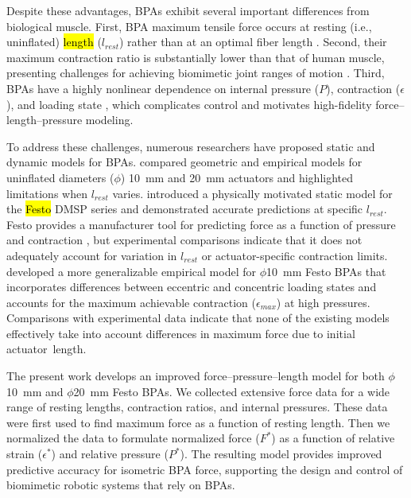 \documentclass[actuators,article,accept,pdftex,moreauthors]{Definitions/mdpi}
\begin{document}
Despite these advantages, BPAs exhibit several important differences from biological muscle. First, BPA maximum tensile force occurs at resting (i.e., uninflated) \hl{length} %
 ($l_{rest}$) rather than at an optimal fiber length \citep{liang_comparative_2020}. Second, their maximum contraction ratio is substantially lower than that of human muscle, presenting challenges for achieving biomimetic joint ranges of motion \citep{hunt_modeling_2017, sarosi_comparative_2017, liang_comparative_2020}. Third, BPAs have a highly nonlinear dependence on internal pressure ($P$), contraction ($\epsilon$), and loading state \citep{hunt_modeling_2017, martens_modeling_2017}, which complicates control and motivates high-fidelity force–length–pressure modeling.

To address these challenges, numerous researchers have proposed static and dynamic models for BPAs. \citet{sarosi_comparative_2017} compared geometric and empirical models for uninflated diameters ($\phi$) \qty{10}{\mm} and \qty{20}{\mm} actuators and highlighted limitations when $l_{rest}$ varies. \citet{martens_modeling_2017} introduced a physically motivated static model for the \hl{Festo} %
 DMSP series and demonstrated accurate predictions at specific $l_{rest}$. Festo provides a manufacturer tool for predicting force as a function of pressure and contraction \citep{festo_2026, lang_robert_musclesim_2005}, but experimental comparisons indicate that it does not adequately account for variation in $l_{rest}$ or actuator-specific contraction limits. \citet{hunt_modeling_2017} developed a more generalizable empirical model for $\phi$\qty{10}{\mm} Festo BPAs that incorporates differences between eccentric and concentric loading states and accounts for the maximum achievable contraction ($\epsilon_{max}$) at high pressures. Comparisons with experimental data indicate that none of the existing models effectively take into account differences in maximum force due to initial \mbox{actuator length.}

The present work develops an improved force–pressure–length model for both $\phi$\qty{10}{\mm} and $\phi$\qty{20}{\mm} Festo BPAs. We collected extensive force data for a wide range of resting lengths, contraction ratios, and internal pressures. These data were first used to find maximum force as a function of resting length. Then we normalized the data to formulate normalized force ($F^*$) as a function of relative strain ($\epsilon^*$) and relative pressure ($P^*$). The resulting model provides improved predictive accuracy for isometric BPA force, supporting the design and control of biomimetic robotic systems that rely on BPAs.
\end{document}
